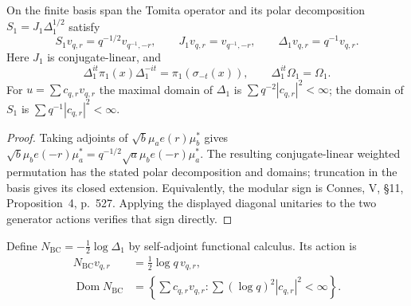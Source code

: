 \begin{lemma}
\label{v4-arith:w5-b:lem:modular}
On the finite basis span the Tomita operator and its polar decomposition
$S_1=J_1\Delta_1^{1/2}$ satisfy
\begin{equation}
\label{v4-arith:w5-b:eq:Delta-basis}
 S_1v_{q,r}=q^{-1/2}v_{q^{-1},-r},\qquad
 J_1v_{q,r}=v_{q^{-1},-r},\qquad
 \Delta_1v_{q,r}=q^{-1}v_{q,r}.
\end{equation}
Here $J_1$ is conjugate-linear, and
\[
 \Delta_1^{it}\pi_1(x)\Delta_1^{-it}=\pi_1(\sigma_{-t}(x)),
 \qquad \Delta_1^{it}\Omega_1=\Omega_1.
\]
For $u=\sum c_{q,r}v_{q,r}$ the maximal domain of $\Delta_1$ is
$\sum q^{-2}|c_{q,r}|^2<\infty$; the domain of $S_1$ is
$\sum q^{-1}|c_{q,r}|^2<\infty$.
\end{lemma}
\begin{proof}
Taking adjoints of $\sqrt b\mu_a e(r)\mu_b^*$ gives
$\sqrt b\mu_b e(-r)\mu_a^*=q^{-1/2}\sqrt a\mu_b e(-r)\mu_a^*$.
The resulting conjugate-linear weighted permutation has the stated
polar decomposition and domains; truncation in the basis gives its
closed extension. Equivalently, the modular sign is Connes, V, \S11,
Proposition~4, p.~527. Applying the displayed diagonal unitaries to
the two generator actions verifies that sign directly.
\end{proof}

\begin{definition}
\label{v4-arith:w5-b:def:N-BC}
Define $N_{\mathrm{BC}}=-\tfrac12\log\Delta_1$ by self-adjoint
functional calculus. Its action is
\begin{equation}
\label{v4-arith:w5-b:eq:N-BC}
 \begin{aligned}
 N_{\mathrm{BC}}v_{q,r}&=\tfrac12\log q\,v_{q,r},\\
 \operatorname{Dom}N_{\mathrm{BC}}
 &=\left\{\sum c_{q,r}v_{q,r}:\sum(\log q)^2|c_{q,r}|^2<\infty\right\}.
 \end{aligned}
\end{equation}
\end{definition}

